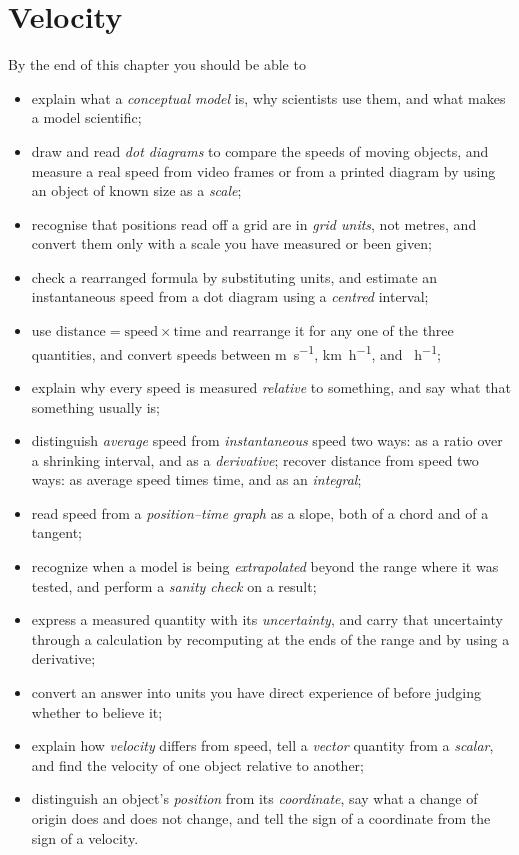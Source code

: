 \documentclass[11pt,twoside,openany]{book}
\newcounter{check}[chapter]
\begin{document}
\setcounter{chapter}{0}

\chapter{Velocity}

\begin{tcolorbox}[enhanced,colback=white,colframe=teal,sharp corners,boxrule=1pt,
  title=\textbf{In this chapter},coltitle=white,colbacktitle=teal,left=3mm,right=3mm]
By the end of this chapter you should be able to
\begin{itemize}[itemsep=2pt,topsep=2pt]
  \item explain what a \emph{conceptual model} is, why scientists use them, and what makes a model scientific;
  \item draw and read \emph{dot diagrams} to compare the speeds of moving objects, and measure a real speed from video frames or from a printed diagram by using an object of known size as a \emph{scale};
  \item recognise that positions read off a grid are in \emph{grid units}, not metres, and convert them only with a scale you have measured or been given;
  \item check a rearranged formula by substituting units, and estimate an instantaneous speed from a dot diagram using a \emph{centred} interval;
  \item use $\text{distance} = \text{speed}\times\text{time}$ and rearrange it for any one of the three quantities, and convert speeds between \si{\metre\per\second}, \si{\kilo\metre\per\hour}, and \si{\mile\per\hour};
  \item explain why every speed is measured \emph{relative} to something, and say what that something usually is;
  \item distinguish \emph{average} speed from \emph{instantaneous} speed two ways: as a ratio over a shrinking interval, and as a \emph{derivative}; recover distance from speed two ways: as average speed times time, and as an \emph{integral};
  \item read speed from a \emph{position--time graph} as a slope, both of a chord and of a tangent;
  \item recognize when a model is being \emph{extrapolated} beyond the range where it was tested, and perform a \emph{sanity check} on a result;
  \item express a measured quantity with its \emph{uncertainty}, and carry that uncertainty through a calculation by recomputing at the ends of the range and by using a derivative;
  \item convert an answer into units you have direct experience of before judging whether to believe it;
  \item explain how \emph{velocity} differs from speed, tell a \emph{vector} quantity from a \emph{scalar}, and find the velocity of one object relative to another;
  \item distinguish an object's \emph{position} from its \emph{coordinate}, say what a change of origin does and does not change, and tell the sign of a coordinate from the sign of a velocity.
\end{itemize}
\end{tcolorbox}
\end{document}
